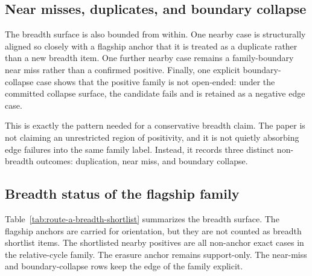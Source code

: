 \documentclass[11pt]{article}
\theoremstyle{definition}
\begin{document}
\subsection{Near misses, duplicates, and boundary collapse}

The breadth surface is also bounded from within. One nearby case is structurally aligned so closely with a flagship anchor that it is treated as a duplicate rather than a new breadth item. One further nearby case remains a family-boundary near miss rather than a confirmed positive. Finally, one explicit boundary-collapse case shows that the positive family is not open-ended: under the committed collapse surface, the candidate fails and is retained as a negative edge case.

This is exactly the pattern needed for a conservative breadth claim. The paper is not claiming an unrestricted region of positivity, and it is not quietly absorbing edge failures into the same family label. Instead, it records three distinct non-breadth outcomes: duplication, near miss, and boundary collapse.

\subsection{Breadth status of the flagship family}

Table~\ref{tab:route-a-breadth-shortlist} summarizes the breadth surface. The flagship anchors are carried for orientation, but they are not counted as breadth shortlist items. The shortlisted nearby positives are all non-anchor exact cases in the relative-cycle family. The erasure anchor remains support-only. The near-miss and boundary-collapse rows keep the edge of the family explicit.
\end{document}
